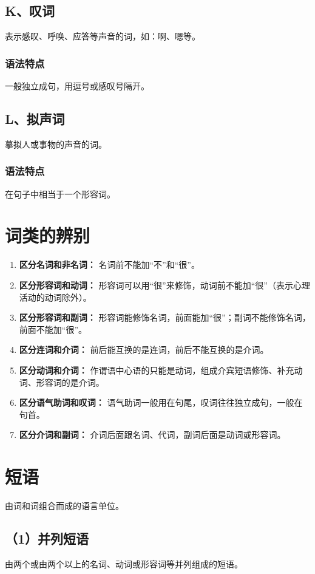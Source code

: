 \subsection{K、叹词}
表示感叹、呼唤、应答等声音的词，如：啊、嗯等。

\subsubsection*{语法特点}
一般独立成句，用逗号或感叹号隔开。

\subsection{L、拟声词}
摹拟人或事物的声音的词。

\subsubsection*{语法特点}
在句子中相当于一个形容词。

\section{词类的辨别}
\begin{enumerate}
    \item \textbf{区分名词和非名词：} 名词前不能加“不”和“很”。
    \item \textbf{区分形容词和动词：} 形容词可以用“很”来修饰，动词前不能加“很”（表示心理活动的动词除外）。
    \item \textbf{区分形容词和副词：} 形容词能修饰名词，前面能加“很”；副词不能修饰名词，前面不能加“很”。
    \item \textbf{区分连词和介词：} 前后能互换的是连词，前后不能互换的是介词。
    \item \textbf{区分动词和介词：} 作谓语中心语的只能是动词，组成介宾短语修饰、补充动词、形容词的是介词。
    \item \textbf{区分语气助词和叹词：} 语气助词一般用在句尾，叹词往往独立成句，一般在句首。
    \item \textbf{区分介词和副词：} 介词后面跟名词、代词，副词后面是动词或形容词。
\end{enumerate}

\section{短语}
由词和词组合而成的语言单位。

\subsection{（1）并列短语}
由两个或由两个以上的名词、动词或形容词等并列组成的短语。

